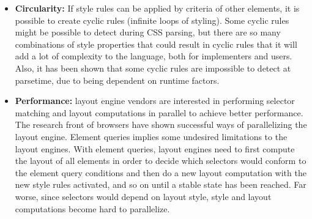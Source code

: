 \documentclass[a4paper,11pt]{kth-mag}
\begin{document}
      \begin{itemize}
        \item \textbf{Circularity:}
        If style rules can be applied by criteria of other \glspl{element}, it is possible to create cyclic rules (infinite loops of styling).
        Some cyclic rules might be possible to detect during \gls{CSS} parsing, but there are so many combinations of style properties that could result in cyclic rules that it will add a lot of complexity to the language, both for implementers and users.
        Also, it has been shown that some cyclic rules are impossible to detect at parsetime, due to being dependent on runtime factors.
        \item \textbf{Performance:} 
        \Gls{layout engine} vendors are interested in performing selector matching and layout computations in parallel to achieve better performance.
        The research front of \glspl{browser} have shown successful ways of parallelizing the \gls{layout engine}.
        Element queries implies some undesired limitations to the \glspl{layout engine}.
        With element queries, \glspl{layout engine} need to first compute the layout of all \glspl{element} in order to decide which selectors would conform to the element query conditions and then do a new layout computation with the new style rules activated, and so on until a stable state has been reached.
        Far worse, since selectors would depend on layout style, style and layout computations become hard to parallelize.
      \end{itemize}
\end{document}
